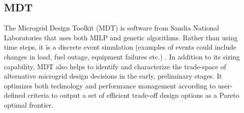\documentclass[final,3p,times]{elsarticle}
\begin{document}
\subsection{MDT}

The Microgrid Design Toolkit (MDT) is software from Sandia National Laboratories that uses both MILP and genetic algorithms. Rather than using time steps, it is a discrete event simulation (examples of events could include changes in load, fuel outage, equipment failures etc.) \cite{tools_summary}. In addition to its sizing capability, MDT also helps to identify and characterize the trade-space of alternative microgrid design decisions in the early, preliminary stages. It optimizes both technology and performance management according to user-defined criteria to output a set of efficient trade-off design options as a Pareto optimal frontier.

\end{document}
